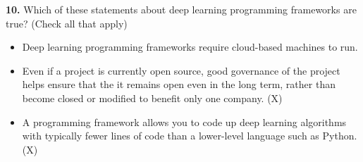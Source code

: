 \textbf{10.} Which of these statements about deep learning programming frameworks are true? (Check all that apply)
\begin{itemize}
    \item Deep learning programming frameworks require cloud-based machines to run.
    \item Even if a project is currently open source, good governance of the project helps ensure that the it remains open even in the long term, rather than become closed or modified to benefit only one company. (X)
    \item A programming framework allows you to code up deep learning algorithms with typically fewer lines of code than a lower-level language such as Python. (X)
\end{itemize}